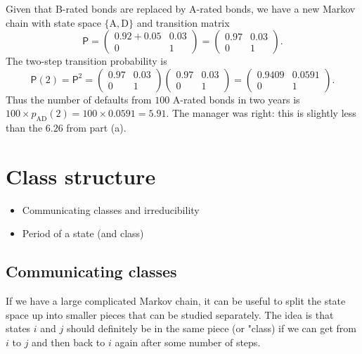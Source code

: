 \documentclass[
  a4paper,
]{article}
\providecommand{\tightlist}{%
  \setlength{\itemsep}{0pt}\setlength{\parskip}{0pt}}
\theoremstyle{definition}
\theoremstyle{definition}
\theoremstyle{definition}
\theoremstyle{remark}
\begin{document}
\begin{myanswers}
Given that B-rated bonds are replaced by A-rated bonds, we have a new Markov chain with state space \(\{\mathrm{A},\mathrm{D}\}\) and transition matrix
\[ \mathsf P = \begin{pmatrix} 0.92+0.05 & 0.03 \\ 0 & 1 \end{pmatrix} =  \begin{pmatrix} 0.97 & 0.03 \\ 0 & 1 \end{pmatrix} .  \]
The two-step transition probability is
\[ \mathsf P(2) = \mathsf P^2 =  \begin{pmatrix} 0.97 & 0.03 \\ 0 & 1 \end{pmatrix} \begin{pmatrix} 0.97 & 0.03 \\ 0 & 1 \end{pmatrix} = \begin{pmatrix} 0.9409 & 0.0591 \\ 0 & 1 \end{pmatrix} .  \]
Thus the number of defaults from \(100\) A-rated bonds in two years is \(100\times p_{\mathrm{AD}}(2) = 100\times 0.0591 = 5.91\). The manager was right: this is slightly less than the \(6.26\) from part (a).

\end{myanswers}

\hypertarget{S07-classes}{%
\section{Class structure}\label{S07-classes}}

\begin{itemize}
\tightlist
\item
  Communicating classes and irreducibility
\item
  Period of a state (and class)
\end{itemize}

\hypertarget{comm-classes}{%
\subsection{Communicating classes}\label{comm-classes}}

If we have a large complicated Markov chain, it can be useful to split the state space up into smaller pieces that can be studied separately. The idea is that states \(i\) and \(j\) should definitely be in the same piece (or "class) if we can get from \(i\) to \(j\) and then back to \(i\) again after some number of steps.
\end{document}
